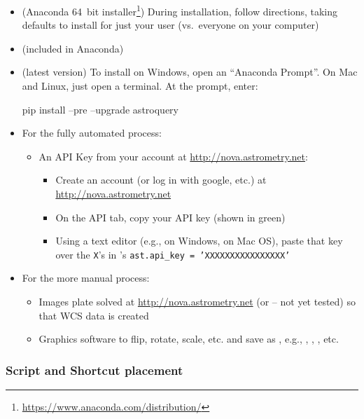 \begin{itemize}
\item {} (Anaconda 64~bit
  installer\footnote{\url{https://www.anaconda.com/distribution/}}) During
  installation, follow directions, taking defaults to install for
  just your user (vs.\ everyone on your computer)
\item {} (included in Anaconda)
\item {} (latest version) To install on Windows,
  open an ``Anaconda Prompt''. On Mac and Linux, just open a
  terminal. At the prompt, enter:
  \begin{commands}
    pip install --pre --upgrade astroquery
  \end{commands}
\item For the fully automated process:
  \begin{itemize}
  \item An API Key from your account at \url{http://nova.astrometry.net}:
    \begin{itemize}
    \item Create an account (or log in with google, etc.) at \url{http://nova.astrometry.net}
    \item On the API tab, copy your API key (shown in green)
    \item Using a text editor (e.g.,  on Windows,
       on Mac OS), paste that key over the \texttt{X}'s
      in 's
      \texttt{ast.api\_key = 'XXXXXXXXXXXXXXXX'}
    \end{itemize}
  \end{itemize}
\item For the more manual process: 
  \begin{itemize}
  \item Images plate solved at \url{http://nova.astrometry.net} (or  -- not yet tested) so that WCS data is created
  \item Graphics software to flip, rotate, scale, etc. and save as , e.g., , , , etc.
  \end{itemize}
\end{itemize}

\subsubsection{Script and Shortcut placement}


